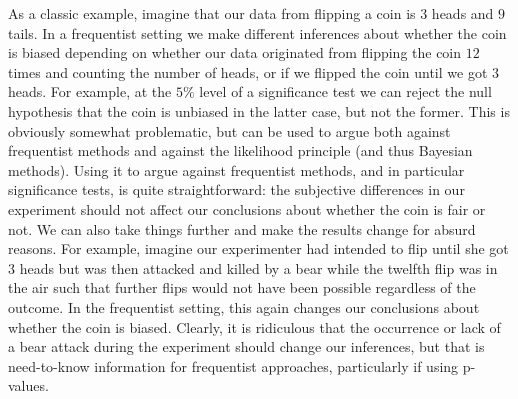 As a classic example, 
imagine that our data from flipping a coin is $3$ heads and $9$ tails.
In a frequentist setting we make different inferences about whether the coin is biased 
depending on whether our data originated from flipping the coin $12$ times and counting the number of heads, or if we 
flipped the coin until we got $3$ heads.  For example, at the $5\%$ level of a significance test we can reject the null
hypothesis that the coin is unbiased in the latter case, but not the former.  This is obviously somewhat problematic, but
can be used to argue both against frequentist methods and against the likelihood principle (and thus Bayesian methods).  Using it
to argue against frequentist methods, and in particular significance tests, is quite straightforward: the subjective
differences in our experiment should not affect our conclusions about whether the coin is fair or not.  We can also take things
further and make the results change for absurd reasons.  For example, imagine our experimenter had intended to flip until she got
$3$ heads but was then attacked and killed by a bear while the twelfth flip was in the air such that further flips would not
have been possible regardless of the outcome.  In the frequentist setting, this again changes our conclusions
about whether the coin is biased.  Clearly, it is ridiculous that the occurrence or lack of a bear attack during the experiment
should change our inferences, but that is need-to-know information for frequentist approaches, particularly if using p-values.

